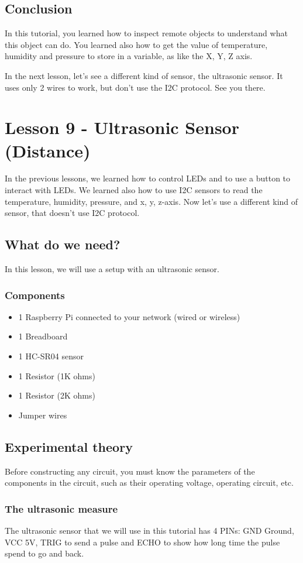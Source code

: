 \documentclass[10pt,twoside,english]{_support/latex/sbabook/sbabook}
\begin{document}
\section{Conclusion}
In this tutorial, you learned how to inspect remote objects to understand what this object can do. You learned also how to get the value of temperature, humidity and pressure to store in a variable, as like the X, Y, Z axis. 

In the next lesson, let’s see a different kind of sensor, the ultrasonic sensor. It uses only 2 wires to work, but don't use the I2C protocol. See you there.
\chapter{Lesson 9 - Ultrasonic Sensor (Distance)}
In the previous lessons, we learned how to control LEDs and to use a button to interact with LEDs. We learned also how to use I2C sensors to read the temperature, humidity, pressure, and x, y, z-axis. Now let's use a different kind of sensor, that doesn't use I2C protocol. 
\section{What do we need?}
In this lesson, we will use a setup with an ultrasonic sensor.
\subsection{Components}
\begin{itemize}
\item 1 Raspberry Pi connected to your network (wired or wireless)
\item 1 Breadboard
\item 1 HC-SR04 sensor
\item 1 Resistor (1K ohms)
\item 1 Resistor (2K ohms)
\item Jumper wires
\end{itemize}
\section{Experimental theory}
Before constructing any circuit, you must know the parameters of the components in the circuit, such as their operating voltage, operating circuit, etc.
\subsection{The ultrasonic measure}
The ultrasonic sensor that we will use in this tutorial has 4 PINs: GND Ground, VCC 5V, TRIG to send a pulse and ECHO to show how long time the pulse spend to go and back.  
\end{document}
